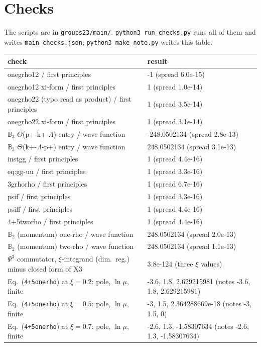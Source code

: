 \documentclass[10pt]{article}
\def\mf#1{\mathbb{#1}}
\newcommand{\eqn}[1]{Eq.~(\texttt{#1})}
\begin{document}
\section{Checks}\label{sec:checks}
The scripts are in \texttt{groups23/main/}. \texttt{python3 run\_checks.py} runs all of them and writes \texttt{main\_checks.json}; \texttt{python3 make\_note.py} writes this table.
\begin{center}\small
\begin{longtable}{@{}p{}p{}@{}}
\toprule
check & result\\ \midrule
onegrho12 / first principles & -1 (spread 6.0e-15)\\
onegrho12 xi-form / first principles & 1 (spread 1.0e-14)\\
onegrho22 (typo read as product) / first principles & 1 (spread 3.5e-14)\\
onegrho22 xi-form / first principles & 1 (spread 3.1e-14)\\
$\mf B_3$ $\Theta$(p+-k+-$\Lambda$) entry / wave function & -248.0502134 (spread 2.8e-13)\\
$\mf B_3$ $\Theta$(k+-$\Lambda$-p+) entry / wave function & 248.0502134 (spread 3.1e-13)\\
instgg / first principles & 1 (spread 4.4e-16)\\
eq:gg-uu / first principles & 1 (spread 3.3e-16)\\
3grhorho / first principles & 1 (spread 6.7e-16)\\
psif / first principles & 1 (spread 3.3e-16)\\
psiff / first principles & 1 (spread 4.4e-16)\\
4+5tworho / first principles & 1 (spread 4.4e-16)\\
$\mf B_2$ (momentum) one-rho / wave function & 248.0502134 (spread 2.0e-13)\\
$\mf B_2$ (momentum) two-rho / wave function & 248.0502134 (spread 1.1e-13)\\
$\Psi^3$ commutator, $\xi$-integrand (dim.\ reg.) minus closed form of X3 & 3.8e-124 (three $\xi$ values)\\
\eqn{4+5onerho} at $\xi=0.2$: pole, $\ln\mu$, finite & -3.6, 1.8, 2.629215981 (notes -3.6, 1.8, 2.629215981)\\
\eqn{4+5onerho} at $\xi=0.5$: pole, $\ln\mu$, finite & -3, 1.5, 2.364288669e-18 (notes -3, 1.5, 0)\\
\eqn{4+5onerho} at $\xi=0.7$: pole, $\ln\mu$, finite & -2.6, 1.3, -1.58307634 (notes -2.6, 1.3, -1.58307634)\\

\end{longtable}
\end{center}
\end{document}
